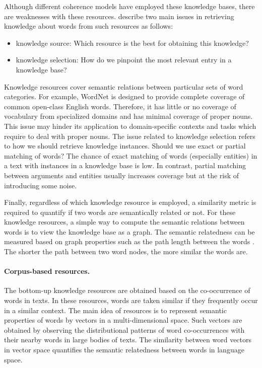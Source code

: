 Although different coherence models have employed these knowledge bases, there are weaknesses with these resources.   
 describe two main issues in retrieving knowledge about words from such resources as follows: 

\begin{itemize}
\item knowledge source: Which resource is the best for obtaining this knowledge? 
\item knowledge selection: How do we pinpoint the most relevant entry in a knowledge base?
\end{itemize}

Knowledge resources cover semantic relations between particular sets of word categories.  
For example, WordNet is designed to provide complete coverage of common open-class English words. 
Therefore, it has little or no coverage of vocabulary from specialized domains and has minimal coverage of proper nouns. 
This issue may hinder its application to domain-specific contexts and tasks which require to deal with proper nouns. 
The issue related to knowledge selection refers to how we should retrieve knowledge instances. Should we use exact or partial matching of words?   
The chance of exact matching of words (especially entities) in a text with instances in a knowledge base is low.  
In contrast, partial matching between arguments and entities usually increases coverage but at the risk of introducing some noise. 

Finally, regardless of which knowledge resource is employed, a similarity metric is required to quantify if two words are semantically related or not.  
For these knowledge resources, a simple way to compute the semantic relations between words is to view the knowledge base as a graph. 
The semantic relatedness can be measured based on graph properties such as the path length between the words \cite{budanitsky06}. 
The shorter the path between two word nodes, the more similar the words are. 

\paragraph{Corpus-based resources.} 
The bottom-up knowledge resources are obtained based on the co-occurrence of words in texts.  
In these resources, words are taken similar if they frequently occur in a similar context. 
The main idea of resources is to represent semantic properties of words by vectors in a \mbox{multi-dimensional} space. 
Such vectors are obtained by observing the distributional patterns of word co-occurrences with their nearby words in large bodies of texts. 
The similarity between word vectors in vector space quantifies the semantic relatedness between words in language space. 


